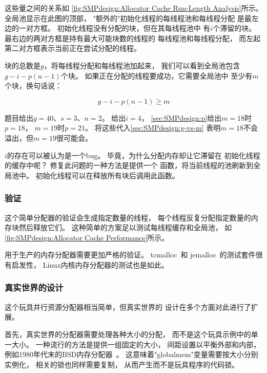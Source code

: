 {{	这些量之间的关系如
	\cref{fig:SMPdesign:Allocator Cache Run-Length Analysis}所示。
	全局池显示在此图的顶部，
	"额外的"初始化线程的每线程池和每线程分配
	是最左边的一对方框。
	初始化线程没有分配的块，但在其每线程池中
	有$i$个滞留的块。
	最右边的两对方框是持有最大可能块数的线程的
	每线程池和每线程分配，
	而左起第二对方框表示当前正在尝试分配的线程。

	块的总数是$g$，将每线程分配和每线程池加起来，
	我们可以看到全局池包含$g-i-p(n-1)$个块。
	如果正在分配的线程要成功，它需要全局池中
	至少有$m$个块，换句话说：

	\begin{equation}
		g - i - p(n - 1) \ge m
	\label{sec:SMPdesign:g-vs-m}
	\end{equation}

	题目给出$g=40$、$s=3$、$n=2$。
	给出$i=4$，
	\cref{sec:SMPdesign:p}给出$m=18$时$p=18$，
	$m=19$时$p=21$。
	将这些代入\cref{sec:SMPdesign:g-vs-m}
	表明$m=18$不会溢出，但$m=19$很可能会。

	$i$的存在可以被认为是一个bug。
	毕竟，为什么分配内存却让它滞留在
	初始化线程的缓存中呢？
	修复此问题的一种方法是提供一个
	函数，将当前线程的池刷新到全局池中。
	初始化线程可以在释放所有块后调用此函数。
}\QuickQuizEndE
}

\subsubsection{验证}

这个简单分配器的验证会生成指定数量的线程，
每个线程反复分配指定数量的内存块然后释放它们。
这种简单的方案足以测试每线程缓存和全局池，
如\cref{fig:SMPdesign:Allocator Cache Performance}所示。

用于生产的内存分配器需要更加严格的验证。
tcmalloc~\cite{ChrisKennelly2020tcmalloc}和
jemalloc~\cite{JasonEvans2011jemalloc}的测试套件很有启发性，
Linux内核内存分配器的测试也是如此。

\subsubsection{真实世界的设计}

这个玩具并行资源分配器相当简单，但真实世界的
设计在多个方面对此进行了扩展。

首先，真实世界的分配器需要处理各种大小的分配，
而不是这个玩具示例中的单一大小。
一种流行的方法是提供一组固定的大小，
间距设置以平衡外部和内部，
例如1980年代末的BSD内存分配器~\cite{McKusick88}。
这意味着"globalmem"变量需要按大小分别实例化，
相关的锁也同样需要复制，
从而产生而不是玩具程序的代码锁。

